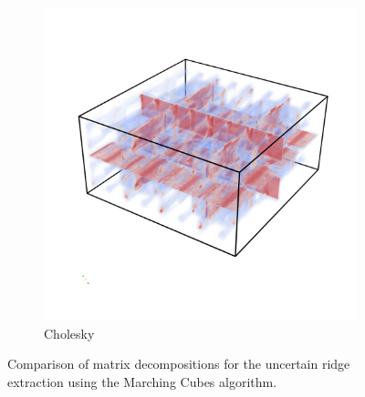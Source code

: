 \begin{figure}
\begin{subfigure}[b]{0.49\textwidth}
        \includegraphics[width=\textwidth]{Images/shiftXoldchol.png}
        \caption{Cholesky}
        \label{fig:MCchol}
    \end{subfigure}
    \caption{Comparison of matrix decompositions for the uncertain
    ridge extraction using the Marching Cubes algorithm.}
    \label{fig:MCcomp}
\end{figure}

